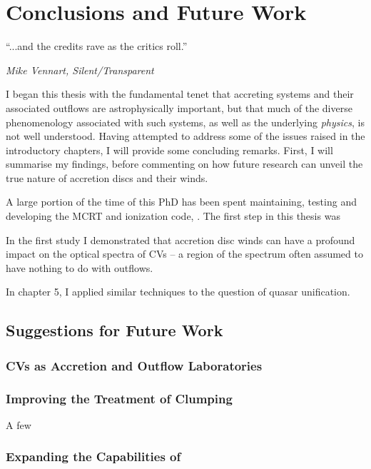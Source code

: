 \chapter{Conclusions and Future Work}

\epigraph{``...and the credits rave as the critics roll.''}
{{\sl Mike Vennart, Silent/Transparent}}

I began this thesis with the fundamental tenet that accreting systems
and their associated outflows are astrophysically important, but that
much of the diverse phenomenology associated with such systems, as well
as the underlying {\em physics}, is not well understood.  
Having attempted to address some of the issues raised in the 
introductory chapters, I will provide some concluding remarks. 
First, I will summarise my findings, before 
commenting on how future research can unveil the true nature of 
accretion discs and their winds.

A large portion of the time of this PhD has been spent maintaining,
testing and developing the MCRT and ionization code, \py. The first 
step in this thesis was 



In the first study I demonstrated that accretion disc winds
can have a profound impact on the optical spectra of CVs -- a region
of the spectrum often assumed to have nothing to do with outflows.

In chapter 5, I applied similar techniques to the question of quasar 
unification.

\section{Suggestions for Future Work}

\subsection{CVs as Accretion and Outflow Laboratories}

\subsection{Improving the Treatment of Clumping}

A few 

\subsection{Expanding the Capabilities of \py}

